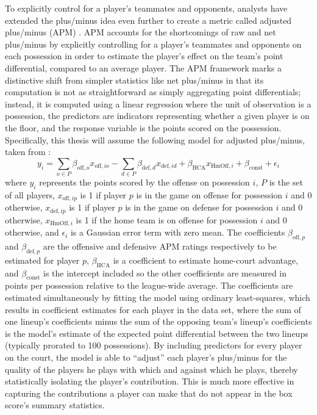 To explicitly control for a player's teammates and opponents, analysts have extended
the plus/minus idea even further to create a metric called adjusted plus/minus (APM)
\cite{Rosenbaum}. APM accounts for the shortcomings of raw and net plus/minus by
explicitly controlling for a player's teammates and opponents on each possession in
order to estimate the player's effect on the team's point differential, compared to
an average player. The APM framework marks a distinctive shift from simpler
statistics like net plus/minus in that its computation is not as straightforward as
simply aggregating point differentials; instead, it is computed using a linear
regression where the unit of observation is a possession, the predictors are
indicators representing whether a given player is on the floor, and the response
variable is the points scored on the possession. Specifically, this thesis will
assume the following model for adjusted plus/minus, taken from \citet{Ilardi}:
\begin{equation} \label{eq:apm}
    y_i = \sum_{o \in P} \beta_{\text{off},o} x_{\text{off},io} -
    \sum_{d \in P} \beta_{\text{def},d} x_{\text{def},id} + \beta_{\text{HCA}}
    x_{\text{HmOff},i} + \beta_{\text{const}} + \epsilon_i
\end{equation}
where $y_i$ represents the points scored by the offense on possession $i$, $P$ is
the set of all players, $x_{\text{off},ip}$ is 1 if player $p$ is in the game
on offense for possession $i$ and 0 otherwise, $x_{\text{def},ip}$ is 1 if player
$p$ is in the game on defense for possession $i$ and 0 otherwise,
$x_{\text{HmOff},i}$ is 1 if the home team is on offense for possession $i$ and 0
otherwise, and $\epsilon_i$ is a Gaussian error term with zero mean. The
coefficients $\beta_{\text{off},p}$ and $\beta_{\text{def},p}$ are the offensive and
defensive APM ratings respectively to be estimated for player $p$,
$\beta_{\text{HCA}}$ is a coefficient to estimate home-court advantage, and
$\beta_{\text{const}}$ is the intercept included so the other coefficients are
measured in points per possession relative to the league-wide average. The
coefficients are estimated simultaneously by fitting the model using ordinary
least-squares, which results in coefficient estimates for each player in the data
set, where the sum of one lineup's coefficients minus the sum of the opposing team's
lineup's coefficients is the model's estimate of the expected point differential
between the two lineups (typically prorated to 100 possessions).  By including
predictors for every player on the court, the model is able to ``adjust'' each
player's plus/minus for the quality of the players he plays with which and against
which he plays, thereby statistically isolating the player's contribution. This is
much more effective in capturing the contributions a player can make that do not
appear in the box score's summary statistics.

